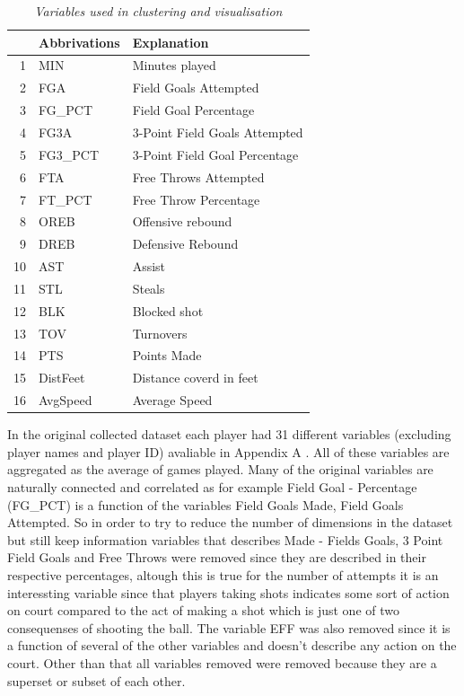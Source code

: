 \documentclass{article}
\begin{document}
\begin{table}[ht]
\centering
\begin{tabular}{rll}
  \hline
 & \textbf{Abbrivations} & \textbf{Explanation} \\ 
  \hline
1 & MIN & Minutes played \\ 
  2 & FGA & Field Goals Attempted \\ 
  3 & FG\_PCT & Field Goal Percentage \\ 
  4 & FG3A & 3-Point Field Goals Attempted \\ 
  5 & FG3\_PCT & 3-Point Field Goal Percentage \\ 
  6 & FTA & Free Throws Attempted \\ 
  7 & FT\_PCT & Free Throw Percentage \\ 
  8 & OREB & Offensive rebound \\ 
  9 & DREB & Defensive Rebound \\ 
  10 & AST & Assist \\ 
  11 & STL & Steals \\ 
  12 & BLK & Blocked shot \\ 
  13 & TOV & Turnovers \\ 
  14 & PTS & Points Made \\ 
  15 & DistFeet & Distance coverd in feet \\ 
  16 & AvgSpeed & Average Speed \\
   \hline
\end{tabular}
\caption{\textit{Variables used in clustering and visualisation}} 
\end{table}

In the original collected dataset each player had 31 different variables (excluding player names and player ID) avaliable in Appendix A . All of these variables are aggregated as the average of games played.   Many of the original variables are naturally connected and correlated as for example Field Goal - Percentage (FG\_PCT) is a function of the variables Field Goals Made, Field Goals Attempted. So in order to try to reduce the number of dimensions in the dataset but still keep information variables that describes Made - Fields Goals, 3 Point Field Goals and Free Throws were removed since they are described in their respective percentages, altough this is true for the number of attempts it is an interessting variable since that players taking shots indicates some sort of action on court compared to the act of making a shot which is just one of two consequenses of shooting the ball.  The variable EFF was also removed since it is a function of several of the other variables and doesn't describe any action on the court. Other than that all variables removed were removed because they are a superset or subset of each other.
\end{document}
